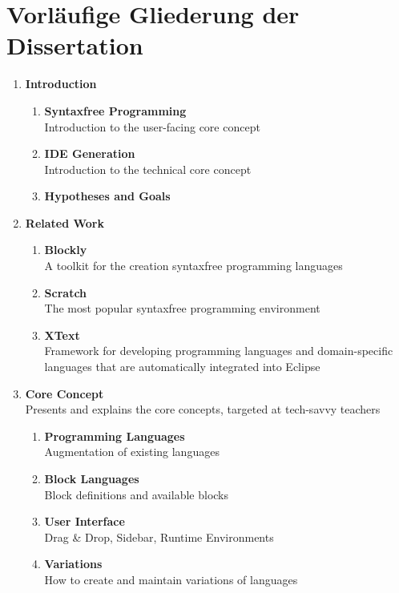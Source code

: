 \documentclass[paper=a4,fontsize=11pt,parskip=half]{scrartcl}
\begin{document}
\section{Vorläufige Gliederung der Dissertation}

\begin{enumerate}[noitemsep]
\item \textbf{Introduction}
  \begin{enumerate}[noitemsep]
  \item \textbf{Syntaxfree Programming} \\
    Introduction to the user-facing core concept
  \item \textbf{IDE Generation} \\
    Introduction to the technical core concept
  \item \textbf{Hypotheses and Goals}
  \end{enumerate}
\item \textbf{Related Work}
  \begin{enumerate}[noitemsep]
  \item \textbf{Blockly}\\
    A toolkit for the creation syntaxfree programming languages
  \item \textbf{Scratch}\\
    The most popular syntaxfree programming environment
  \item \textbf{XText} \\
    Framework for developing programming languages and domain-specific languages that are automatically integrated into Eclipse
  \end{enumerate}
\item \textbf{Core Concept}\\
  Presents and explains the core concepts, targeted at tech-savvy teachers
  \begin{enumerate}
  \item \textbf{Programming Languages}\\
    Augmentation of existing languages
  \item \textbf{Block Languages}\\
    Block definitions and available blocks
  \item \textbf{User Interface}\\
    Drag \& Drop, Sidebar, Runtime Environments
  \item \textbf{Variations}\\
    How to create and maintain variations of languages

\end{enumerate}
\end{enumerate}
\end{document}
